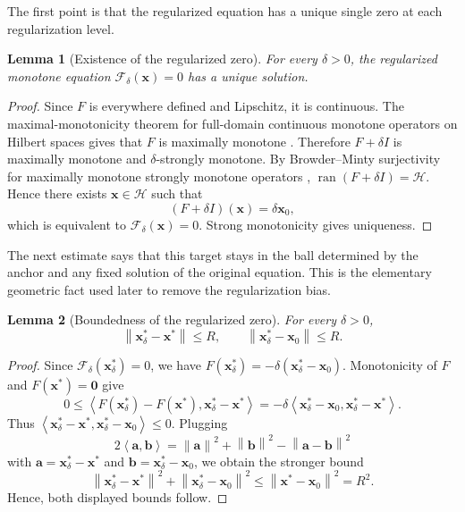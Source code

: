 \documentclass[letterpaper,11pt]{article}
\newcommand{\norm}[1]{\left\| #1 \right\|}
\newcommand{\angles}[1]{\left\langle #1 \right \rangle}
\newcommand{\vect}[1]{\mathbf{#1}}
\newtheorem{lemma}{Lemma}
\begin{document}
The first point is that the regularized equation has a unique single zero at
each regularization level.

\begin{lemma}[Existence of the regularized zero]\label{lem:reg-zero-existence}
For every \(\delta>0\), the regularized monotone equation
\(\mathcal F_\delta(\vect{x})=0\) has a unique solution.
\end{lemma}
\begin{proof}
Since \(F\) is everywhere defined and Lipschitz, it is continuous. The
maximal-monotonicity theorem for full-domain continuous monotone operators on
Hilbert spaces gives that \(F\) is maximally monotone
\cite[Cor.~20.28]{bauschke2017convex}. Therefore \(F+\delta I\) is maximally monotone and
\(\delta\)-strongly monotone. By Browder--Minty surjectivity for maximally
monotone strongly monotone operators \cite[Prop.~22.11(ii)]{bauschke2017convex},
\(\operatorname{ran}(F+\delta I)=\mathcal H\). Hence there exists
\(\vect{x}\in\mathcal H\) such that
\[
    (F+\delta I)(\vect{x})=\delta\vect{x}_0,
\]
which is equivalent to \(\mathcal F_\delta(\vect{x})=0\). Strong monotonicity
gives uniqueness.
\end{proof}

The next estimate says that this target stays in the ball determined by the
anchor and any fixed solution of the original equation. This is the elementary
geometric fact used later to remove the regularization bias.

\begin{lemma}[Boundedness of the regularized zero]\label{lem:reg-and-x0}
For every \(\delta>0\),
\[
    \norm{\vect{x}_\delta^*-\vect{x}^*}\le R,
    \qquad
    \norm{\vect{x}_\delta^*-\vect{x}_0}\le R.
\]
\end{lemma}
\begin{proof}
Since \(\mathcal F_\delta(\vect{x}_\delta^*)=0\), we have
\(F(\vect{x}_\delta^*)=-\delta(\vect{x}_\delta^*-\vect{x}_0)\). Monotonicity of
\(F\) and \(F(\vect{x}^*)=\vect{0}\) give
\[
    0
    \le
    \angles{F(\vect{x}_\delta^*)-F(\vect{x}^*),
            \vect{x}_\delta^*-\vect{x}^*}
    =
    -\delta
    \angles{\vect{x}_\delta^*-\vect{x}_0,
            \vect{x}_\delta^*-\vect{x}^*}.
\]
Thus
\(\angles{\vect{x}_\delta^*-\vect{x}^*,
          \vect{x}_\delta^*-\vect{x}_0}\le0\). Plugging
\[
    2\angles{\vect{a},\vect{b}}
    =
    \norm{\vect{a}}^2+\norm{\vect{b}}^2-\norm{\vect{a}-\vect{b}}^2
\]
with \(\vect{a}=\vect{x}_\delta^*-\vect{x}^*\) and
\(\vect{b}=\vect{x}_\delta^*-\vect{x}_0\), we obtain the stronger bound
\[
    \norm{\vect{x}_\delta^*-\vect{x}^*}^2
    +\norm{\vect{x}_\delta^*-\vect{x}_0}^2
    \le
    \norm{\vect{x}^*-\vect{x}_0}^2
    =
    R^2.
\]
Hence, both displayed bounds follow.
\end{proof}
\end{document}
